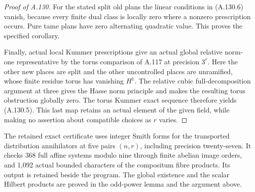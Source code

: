 \begin{proof}[Proof of A.130]
For the stated split old plans the linear conditions
in (A.130.6) vanish, because every finite dual class
is locally zero where a nonzero prescription occurs.
Pure tame plans have zero alternating quadratic
value.  This proves the specified corollary.

Finally, actual local Kummer prescriptions give an
actual global relative norm-one representative by
the torus comparison of A.117 at precision \(3^r\).
Here the other new places are split and the other
uncontrolled places are unramified, whose finite
residue torus has vanishing \(H^1\).
The relative cubic full-decomposition argument at
three gives the Hasse norm principle and makes
the resulting torus obstruction globally zero.
The torus Kummer exact sequence therefore yields
(A.130.5).  This last map retains an actual element
of the given field, while making no assertion
about compatible choices as \(r\) varies.
\end{proof}

The retained exact certificate
uses integer Smith forms for the transported distribution
annihilators at five pairs \((n,r)\), including precision
twenty-seven.  It checks 368 full affine systems modulo
nine through finite abelian image orders, and 1,092 actual
bounded characters of the compositum fibre products.
Its output is retained beside the program.  The global
existence and the scalar Hilbert products are proved in
the odd-power lemma and the argument above.
